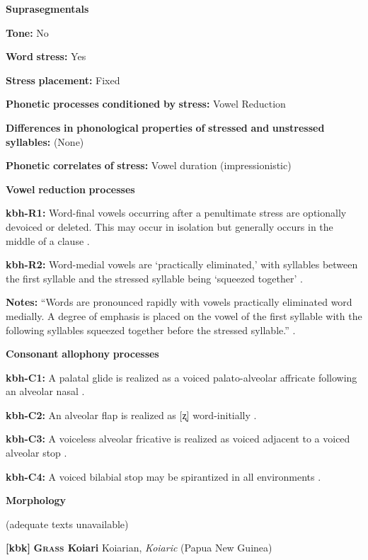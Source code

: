 \begin{styleBody}
\textbf{Suprasegmentals}

\textbf{Tone:} No

\textbf{Word} \textbf{stress:} Yes

\textbf{Stress} \textbf{placement:} Fixed

\textbf{Phonetic} \textbf{processes} \textbf{conditioned} \textbf{by} \textbf{stress:} Vowel Reduction

\textbf{Differences} \textbf{in} \textbf{phonological} \textbf{properties} \textbf{of} \textbf{stressed} \textbf{and} \textbf{unstressed} \textbf{syllables:} (None)

\textbf{Phonetic} \textbf{correlates} \textbf{of} \textbf{stress:} Vowel duration (impressionistic)

\textbf{Vowel} \textbf{reduction} \textbf{processes}

\textbf{kbh-R1:} Word-final vowels occurring after a penultimate stress are optionally devoiced or deleted. This may occur in isolation but generally occurs in the middle of a clause \citep[86]{Howard1967}.

\textbf{kbh-R2:} Word-medial vowels are ‘practically eliminated,’ with syllables between the first syllable and the stressed syllable being ‘squeezed together’ \citep[86-7]{Howard1967}.

\textbf{Notes:} “Words are pronounced rapidly with vowels practically eliminated word medially. A degree of emphasis is placed on the vowel of the first syllable with the following syllables squeezed together before the stressed syllable.” \citep[86-7]{Howard1967}.

\textbf{Consonant} \textbf{allophony} \textbf{processes}

\textbf{kbh-C1:} A palatal glide is realized as a voiced palato-alveolar affricate following an alveolar nasal \citep{Howard1967}.

\textbf{kbh-C2:} An alveolar flap is realized as [ʐ] word-initially \citep[78]{Howard1967}.

\textbf{kbh-C3:} A voiceless alveolar fricative is realized as voiced adjacent to a voiced alveolar stop \citep[78]{Howard1967}.

\textbf{kbh-C4:} A voiced bilabial stop may be spirantized in all environments \citep[77]{Howard1967}.

\textbf{Morphology}

(adequate texts unavailable)

\textbf{[kbk]}   \textbf{\textsc{Grass} \textbf{Koiari}}    Koiarian, \textit{Koiaric} (Papua New Guinea)


\end{styleBody}
